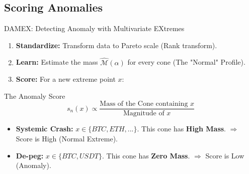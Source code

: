 \documentclass{beamer}
\begin{document}
\subsection{Scoring Anomalies}
\begin{frame}{DAMEX: Detecting Anomaly with Multivariate EXtremes}
    \begin{enumerate}
        \item \textbf{Standardize:} Transform data to Pareto scale (Rank transform).
        \item \textbf{Learn:} Estimate the mass $\hat{\mathcal{M}}(\alpha)$ for every cone (The "Normal" Profile).
        \item \textbf{Score:} For a new extreme point $x$:
    \end{enumerate}

    \begin{block}{The Anomaly Score}
        $$ s_n(x) \propto \frac{\text{Mass of the Cone containing } x}{\text{Magnitude of } x} $$
    \end{block}

    \begin{itemize}
        \item \textbf{Systemic Crash:} $x \in \{BTC, ETH, ...\}$. This cone has \textbf{High Mass}.
        $\Rightarrow$ Score is High (Normal Extreme).
        \item \textbf{De-peg:} $x \in \{BTC, USDT\}$. This cone has \textbf{Zero Mass}.
        $\Rightarrow$ Score is Low (Anomaly).
    \end{itemize}
\end{frame}

\end{document}
